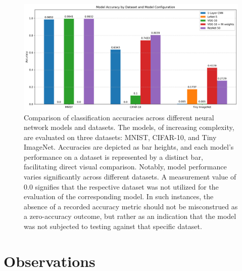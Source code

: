 \documentclass[letterpaper]{article}
\begin{document}
\begin{figure}
    \centering
    \includegraphics[width=0.8\linewidth]{accuracy_comparison.png}
    \caption{Comparison of classification accuracies across different neural network models and datasets. The models, of increasing complexity, are evaluated on three datasets: MNIST, CIFAR-10, and Tiny ImageNet. Accuracies are depicted as bar heights, and each model's performance on a dataset is represented by a distinct bar, facilitating direct visual comparison. Notably, model performance varies significantly across different datasets. A measurement value of 0.0 signifies that the respective dataset was not utilized for the evaluation of the corresponding model. In such instances, the absence of a recorded accuracy metric should not be misconstrued as a zero-accuracy outcome, but rather as an indication that the model was not subjected to testing against that specific dataset.}
    \label{fig:accuracycomparison}
\end{figure}

\section{Observations}
\end{document}
